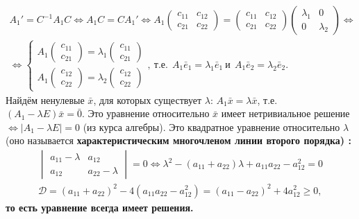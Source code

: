\documentclass[a4paper, 12pt]{article}
\theoremstyle{definition}
\begin{document}
	\begin{align*}
		A_1' = C^{-1}A_1C \Leftrightarrow A_1C = CA_1' \Leftrightarrow A_1\begin{pmatrix} c_{11}&c_{12} \\ c_{21}&c_{22} \end{pmatrix} = \begin{pmatrix} c_{11}&c_{12} \\ c_{21}&c_{22} \end{pmatrix}\begin{pmatrix} \lambda_1&0 \\ 0&\lambda_2 \end{pmatrix} \Leftrightarrow\\\Leftrightarrow
		\begin{cases}
			A_1 \begin{pmatrix} c_{11} \\ c_{21} \end{pmatrix} = \lambda_1 \begin{pmatrix} c_{11} \\ c_{21} \end{pmatrix}\\
			A_1 \begin{pmatrix} c_{12} \\ c_{22} \end{pmatrix} = \lambda_2 \begin{pmatrix} c_{12} \\ c_{22} \end{pmatrix}
		\end{cases}, \ \text{т.е.} \ \ A_1\bar{e}_1 = \lambda_1 \bar{e}_1 \ \text{и} \ \ A_1\bar{e}_2 = \lambda_2 \bar{e}_2.
	\end{align*}
	Найдём ненулевые $\bar{x}$, для которых существует $\lambda$: $A_1 \bar{x} = \lambda \bar{x}$, т.е. $(A_1 - \lambda E)\bar{x} = \bar{0}$. Это уравнение относительно $\bar{x}$ имеет нетривиальное решение $\Leftrightarrow |A_1 - \lambda E| = 0$ (из курса алгебры). Это квадратное уравнение относительно $\lambda$ (оно называется \bfseries характеристическим многочленом линии второго порядка\mdseries) :\begin{align*}
	\begin{vmatrix} a_{11} - \lambda&a_{12}\\a_{12}&a_{22}-\lambda \end{vmatrix} = 0 \Leftrightarrow \lambda^2 - (a_{11} + a_{22})\lambda + a_{11}a_{22}-a_{12}^2 = 0\\
	\mathcal{D} = (a_{11} + a_{22})^2 - 4(a_{11}a_{22}-a_{12}^2) = (a_{11} - a_{22})^2 + 4a_{12}^2 \geqslant 0,
	\end{align*}
	то есть уравнение всегда имеет решения.
\end{document}
